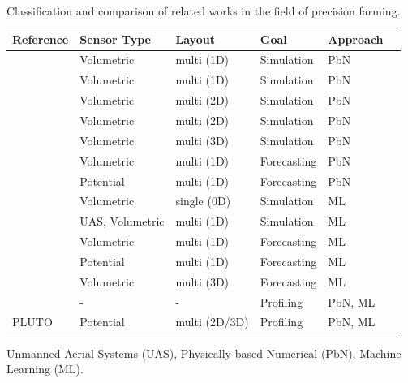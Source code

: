 \begin{table}[t]
\centering
\footnotesize
\caption{Classification and comparison of related works in the field of precision farming.}
\begin{tabular}{llllll}
\toprule
Reference & Sensor Type & Layout & Goal & Approach \\ \midrule
\cite{Pan2021}             & Volumetric        & multi (1D)    & Simulation    & PbN \\
\cite{Li20152382}          & Volumetric        & multi (1D)    & Simulation    & PbN \\
\cite{Egea2016197}         & Volumetric        & multi (2D)    & Simulation    & PbN \\
\cite{Cordeiro2016139}     & Volumetric        & multi (2D)    & Simulation    & PbN \\
\cite{Zapata-Sierra2021}   & Volumetric        & multi (3D)    & Simulation    & PbN \\
\cite{chen2014spatial}    & Volumetric        & multi (1D)    & Forecasting    & PbN \\
\cite{shein2019validation}    & Potential        & multi (1D)    & Forecasting    & PbN \\
\cite{arif2013estimation}  & Volumetric        & single (0D)   & Simulation   & ML \\
\cite{Babaeian2021}        & UAS, Volumetric   & multi (1D)    & Simulation   & ML \\
\cite{Goldstein2018421}    & Volumetric        & multi (1D)    & Forecasting   & ML \\
\cite{Jimenez20201327}     & Potential         & multi (1D)    & Forecasting   & ML \\
\cite{Liang2021}           & Volumetric        & multi (3D)    & Forecasting   & ML \\
\cite{Hinnell2010535}      & -                 & -             & Profiling     & PbN, ML \\
PLUTO            & Potential         & multi (2D/3D) & Profiling     & PbN, ML \\\bottomrule
\end{tabular}
\begin{tablenotes}
\scriptsize
\item Unmanned Aerial Systems (UAS), Physically-based Numerical (PbN), Machine Learning (ML).
\end{tablenotes}
\label{pluto-tbl:related}
\end{table}


